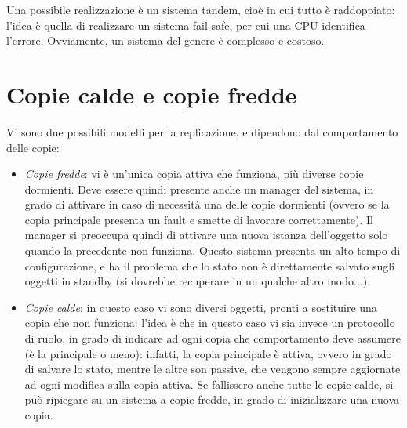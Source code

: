 Una possibile realizzazione è un sistema tandem, cioè in cui tutto è
raddoppiato: l'idea è quella di realizzare un
sistema fail-safe, per cui una CPU identifica l'errore. Ovviamente, un sistema
del genere è complesso e costoso.
\section{Copie calde e copie fredde}
Vi sono due possibili modelli per la replicazione, e dipendono dal
comportamento delle copie:
\begin{itemize}
 \item \textit{Copie fredde}: vi è un'unica copia attiva che funziona, più
diverse copie dormienti. Deve essere quindi
 presente anche un manager del sistema, in grado di attivare in caso di
necessità una delle copie dormienti (ovvero se
 la copia principale presenta un fault e smette di lavorare correttamente). Il
manager si preoccupa quindi di attivare
 una nuova istanza dell'oggetto solo quando la precedente non funziona. Questo
sistema presenta un alto tempo di
 configurazione, e ha il problema che lo stato non è direttamente salvato sugli
oggetti in standby (si dovrebbe
 recuperare in un qualche altro modo...).
 \item \textit{Copie calde}: in questo caso vi sono diversi oggetti, pronti a
sostituire una copia che non funziona:
 l'idea è che in questo caso vi sia invece un protocollo di ruolo, in grado di
indicare ad ogni copia che comportamento
 deve assumere (è la principale o meno): infatti, la copia principale è attiva,
ovvero in grado di salvare lo stato,
 mentre le altre son passive, che vengono sempre aggiornate ad ogni modifica
sulla copia attiva. Se fallissero anche
 tutte le copie calde, si può ripiegare su un sistema a copie fredde, in grado
di inizializzare una nuova copia.
\end{itemize}
